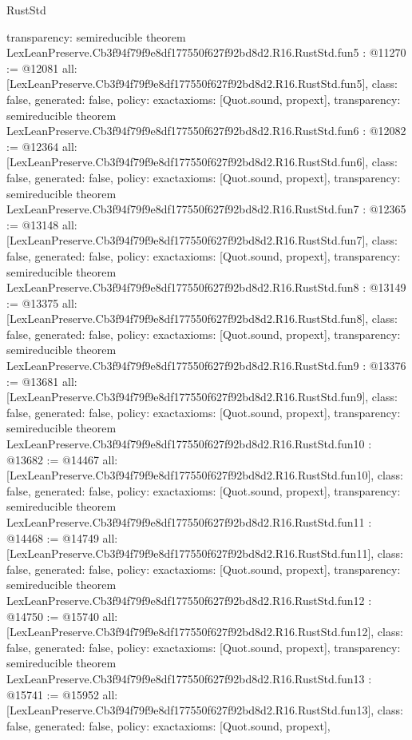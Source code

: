 \begin{lexlean}{RustStd}
\begin{coremodule}
{  transparency: semireducible
}
theorem LexLeanPreserve.Cb3f94f79f9e8df177550f627f92bd8d2.R16.RustStd.fun5 : @11270 := @12081 {
  all: [LexLeanPreserve.Cb3f94f79f9e8df177550f627f92bd8d2.R16.RustStd.fun5],
  class: false,
  generated: false,
  policy: exact{axioms: [Quot.sound, propext]},
  transparency: semireducible
}
theorem LexLeanPreserve.Cb3f94f79f9e8df177550f627f92bd8d2.R16.RustStd.fun6 : @12082 := @12364 {
  all: [LexLeanPreserve.Cb3f94f79f9e8df177550f627f92bd8d2.R16.RustStd.fun6],
  class: false,
  generated: false,
  policy: exact{axioms: [Quot.sound, propext]},
  transparency: semireducible
}
theorem LexLeanPreserve.Cb3f94f79f9e8df177550f627f92bd8d2.R16.RustStd.fun7 : @12365 := @13148 {
  all: [LexLeanPreserve.Cb3f94f79f9e8df177550f627f92bd8d2.R16.RustStd.fun7],
  class: false,
  generated: false,
  policy: exact{axioms: [Quot.sound, propext]},
  transparency: semireducible
}
theorem LexLeanPreserve.Cb3f94f79f9e8df177550f627f92bd8d2.R16.RustStd.fun8 : @13149 := @13375 {
  all: [LexLeanPreserve.Cb3f94f79f9e8df177550f627f92bd8d2.R16.RustStd.fun8],
  class: false,
  generated: false,
  policy: exact{axioms: [Quot.sound, propext]},
  transparency: semireducible
}
theorem LexLeanPreserve.Cb3f94f79f9e8df177550f627f92bd8d2.R16.RustStd.fun9 : @13376 := @13681 {
  all: [LexLeanPreserve.Cb3f94f79f9e8df177550f627f92bd8d2.R16.RustStd.fun9],
  class: false,
  generated: false,
  policy: exact{axioms: [Quot.sound, propext]},
  transparency: semireducible
}
theorem LexLeanPreserve.Cb3f94f79f9e8df177550f627f92bd8d2.R16.RustStd.fun10 : @13682 := @14467 {
  all: [LexLeanPreserve.Cb3f94f79f9e8df177550f627f92bd8d2.R16.RustStd.fun10],
  class: false,
  generated: false,
  policy: exact{axioms: [Quot.sound, propext]},
  transparency: semireducible
}
theorem LexLeanPreserve.Cb3f94f79f9e8df177550f627f92bd8d2.R16.RustStd.fun11 : @14468 := @14749 {
  all: [LexLeanPreserve.Cb3f94f79f9e8df177550f627f92bd8d2.R16.RustStd.fun11],
  class: false,
  generated: false,
  policy: exact{axioms: [Quot.sound, propext]},
  transparency: semireducible
}
theorem LexLeanPreserve.Cb3f94f79f9e8df177550f627f92bd8d2.R16.RustStd.fun12 : @14750 := @15740 {
  all: [LexLeanPreserve.Cb3f94f79f9e8df177550f627f92bd8d2.R16.RustStd.fun12],
  class: false,
  generated: false,
  policy: exact{axioms: [Quot.sound, propext]},
  transparency: semireducible
}
theorem LexLeanPreserve.Cb3f94f79f9e8df177550f627f92bd8d2.R16.RustStd.fun13 : @15741 := @15952 {
  all: [LexLeanPreserve.Cb3f94f79f9e8df177550f627f92bd8d2.R16.RustStd.fun13],
  class: false,
  generated: false,
  policy: exact{axioms: [Quot.sound, propext]},
}
\end{coremodule}
\end{lexlean}
